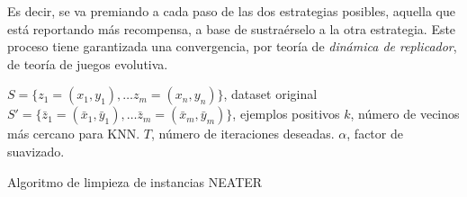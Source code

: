 Es decir, se va premiando a cada paso de las dos estrategias posibles, aquella que está reportando más recompensa, a base de
sustraérselo a la otra estrategia. Este proceso tiene garantizada una convergencia, por teoría de \textit{dinámica de replicador},
de teoría de juegos evolutiva.

\begin{algorithm}[H]
\begin{algorithmic}[1]
  \REQUIRE $S = \{z_1 = (x_1, y_1), \ldots z_m = (x_n, y_n)\}$, dataset original
  \REQUIRE $S' = \{\bar{z}_1=(\bar{x}_1, \bar{y}_1), \ldots \bar{z}_m=(\bar{x}_m, \bar{y}_m)\}$, ejemplos positivos
  \REQUIRE $k$, número de vecinos más cercano para KNN.
  \REQUIRE $T$, número de iteraciones deseadas.
  \REQUIRE $\alpha$, factor de suavizado.
  \NEWLINE
    \ENDFOR
  \ENDFOR
  \NEWLINE
    \ENDIF
  \ENDFOR
  \NEWLINE
\end{algorithmic}
\caption{Algoritmo de limpieza de instancias NEATER}
\label{alg:neater}
\end{algorithm}
